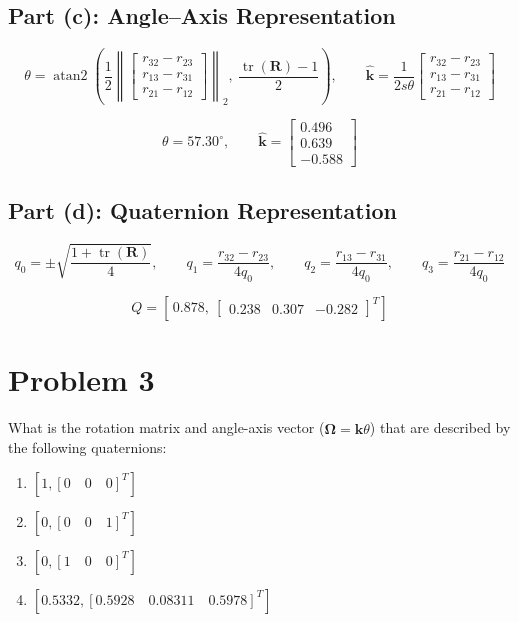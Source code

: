 \documentclass[11pt]{article}
\newcommand{\R}{\bm{R}}
\newcommand{\khat}{\widehat{\bm{k}}}
\newcommand{\atantwo}{\operatorname{atan2}}
\begin{document}
\subsection*{Part (c): Angle--Axis Representation}
\[
    \theta = \atantwo\!\left(\frac{1}{2}\left\lVert\begin{bmatrix}r_{32}-r_{23}\\ r_{13}-r_{31}\\ r_{21}-r_{12}\end{bmatrix}\right\rVert_{2},\ \frac{\operatorname{tr}(\R)-1}{2}\right), \qquad
    \khat = \frac{1}{2s\theta}\begin{bmatrix}r_{32}-r_{23}\\ r_{13}-r_{31}\\ r_{21}-r_{12}\end{bmatrix}
\]
\begin{result}
\[
    \theta = 57.30^\circ, \qquad \khat = \begin{bmatrix}0.496\\ 0.639\\ -0.588\end{bmatrix}
\]
\end{result}

\subsection*{Part (d): Quaternion Representation}
\[
    q_{0} = \pm\sqrt{\frac{1+\operatorname{tr}(\R)}{4}}, \qquad
    q_{1} = \frac{r_{32}-r_{23}}{4q_{0}}, \qquad
    q_{2} = \frac{r_{13}-r_{31}}{4q_{0}}, \qquad
    q_{3} = \frac{r_{21}-r_{12}}{4q_{0}}
\]
\begin{result}
\[
    Q = \left[\,0.878,\ \begin{bmatrix}0.238 & 0.307 & -0.282\end{bmatrix}^{T}\right]
\]
\end{result}

\section*{Problem 3}

\begin{statement}
What is the rotation matrix and angle-axis vector ($\bm\Omega = \khat\theta$) that are described by the following quaternions:
\begin{enumerate}[label=(\alph*), leftmargin=1.6em, itemsep=2pt]
    \item $[1,[0\quad 0\quad 0]^{T}]$
    \item $[0,[0\quad 0\quad 1]^{T}]$
    \item $[0,[1\quad 0\quad 0]^{T}]$
    \item $[0.5332,[0.5928\quad 0.08311\quad 0.5978]^{T}]$
\end{enumerate}
\end{statement}
\end{document}
